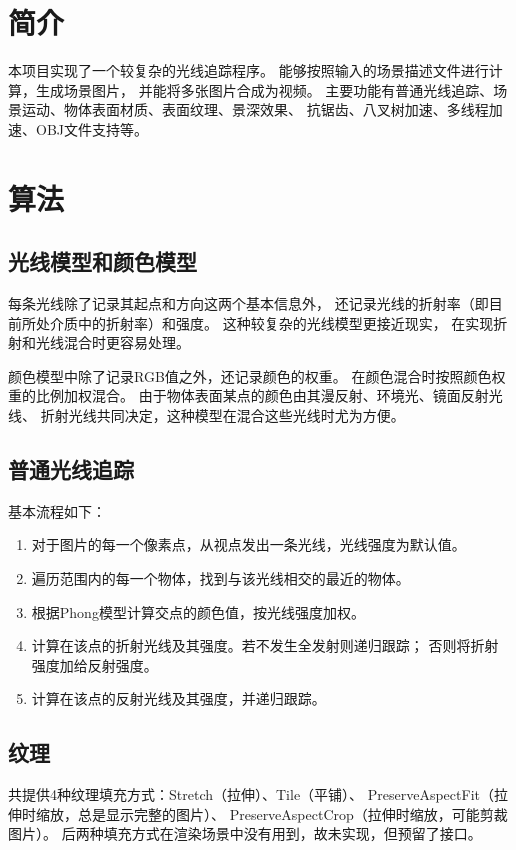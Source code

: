 
\maketitle %

\section{简介}
本项目实现了一个较复杂的光线追踪程序。%
能够按照输入的场景描述文件进行计算，生成场景图片，%
并能将多张图片合成为视频。%
主要功能有普通光线追踪、场景运动、物体表面材质、表面纹理、景深效果、%
抗锯齿、八叉树加速、多线程加速、OBJ文件支持等。

\section{算法}
\subsection{光线模型和颜色模型}
每条光线除了记录其起点和方向这两个基本信息外，%
还记录光线的折射率（即目前所处介质中的折射率）和强度。%
这种较复杂的光线模型更接近现实，%
在实现折射和光线混合时更容易处理。%

颜色模型中除了记录RGB值之外，还记录颜色的权重。%
在颜色混合时按照颜色权重的比例加权混合。%
由于物体表面某点的颜色由其漫反射、环境光、镜面反射光线、%
折射光线共同决定，这种模型在混合这些光线时尤为方便。%

\subsection{普通光线追踪}
基本流程如下：
\begin{enumerate}
\item
对于图片的每一个像素点，从视点发出一条光线，光线强度为默认值。
\item
遍历范围内的每一个物体，找到与该光线相交的最近的物体。
\item
根据Phong模型计算交点的颜色值，按光线强度加权。
\item
计算在该点的折射光线及其强度。若不发生全发射则递归跟踪；%
否则将折射强度加给反射强度。
\item
计算在该点的反射光线及其强度，并递归跟踪。
\end{enumerate}

\subsection{纹理}
共提供4种纹理填充方式：Stretch（拉伸）、Tile（平铺）、%
PreserveAspectFit（拉伸时缩放，总是显示完整的图片）、%
PreserveAspectCrop（拉伸时缩放，可能剪裁图片）。%
后两种填充方式在渲染场景中没有用到，故未实现，但预留了接口。%

